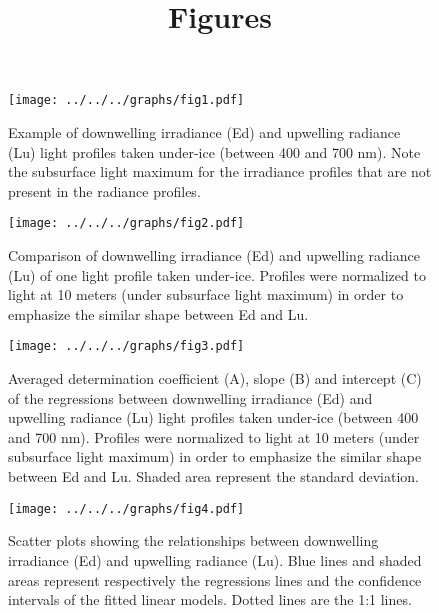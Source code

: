 \documentclass[12pt,a4paper]{scrartcl}
\title{Figures}
\date{}
\begin{document}
    \maketitle

     \begin{figure}[ht]
         \centering
         \texttt{[image: ../../../graphs/fig1.pdf]}
         \caption{Example of downwelling irradiance (Ed) and upwelling radiance (Lu) light profiles taken under-ice (between 400 and 700 nm). Note the subsurface light maximum for the irradiance profiles that are not present in the radiance profiles.}
     \end{figure}

    \clearpage
    \newpage

    \begin{figure}[ht]
        \centering
        \texttt{[image: ../../../graphs/fig2.pdf]}
        \caption{Comparison of downwelling irradiance (Ed) and upwelling radiance (Lu) of one light profile taken under-ice. Profiles were normalized to light at 10 meters (under subsurface light maximum) in order to emphasize the similar shape between Ed and Lu.}
    \end{figure}

    \clearpage
    \newpage

    \begin{figure}[ht]
        \centering
        \texttt{[image: ../../../graphs/fig3.pdf]}
        \caption{Averaged determination coefficient (A),  slope (B) and intercept (C) of the regressions between downwelling irradiance (Ed) and upwelling radiance (Lu) light profiles taken under-ice (between 400 and 700 nm). Profiles were normalized to light at 10 meters (under subsurface light maximum) in order to emphasize the similar shape between Ed and Lu. Shaded area represent the standard deviation.}
    \end{figure}

    \clearpage
    \newpage

    \begin{figure}[ht]
        \centering
        \texttt{[image: ../../../graphs/fig4.pdf]}
        \caption{Scatter plots showing the relationships between downwelling irradiance (Ed) and upwelling radiance (Lu). Blue lines and shaded areas represent respectively the regressions lines and the confidence intervals of the fitted linear models. Dotted lines are the 1:1 lines.}
    \end{figure}
\end{document}
